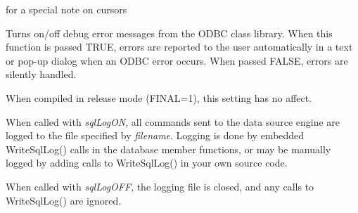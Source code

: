 

 for a special note on cursors


\label{wxdbsetdebugerrormessages}




Turns on/off debug error messages from the ODBC class library.  When
this function is passed TRUE, errors are reported to the user automatically
in a text or pop-up dialog when an ODBC error occurs.  When passed FALSE,
errors are silently handled.

When compiled in release mode (FINAL=1), this setting has no affect.




\label{wxdbsetsqllogging}





When called with {\it sqlLogON}, all commands sent to the data source engine are logged to the file specified by {\it filename}.  Logging is done by embedded WriteSqlLog() calls in the database member functions, or may be manually logged by adding calls to WriteSqlLog() in your own source code.

When called with {\it sqlLogOFF}, the logging file is closed, and any calls to WriteSqlLog() are ignored.


\label{wxdbtablexists}

